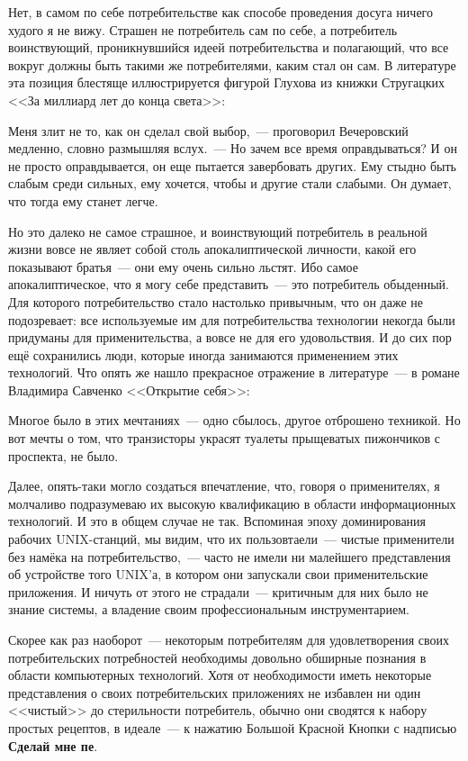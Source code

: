 Нет, в самом по себе потребительстве как способе проведения досуга ничего худого я не вижу. Страшен не потребитель сам по себе, а потребитель воинствующий, проникнувшийся идеей потребительства и полагающий, что все вокруг должны быть такими же потребителями, каким стал он сам. В литературе эта позиция блестяще иллюстрируется фигурой Глухова из книжки Стругацких <<За миллиард лет до конца света>>:

\begin{shadequote}{}
Меня злит не то, как он сделал свой выбор,~--- проговорил Вечеровский медленно, словно размышляя вслух.~--- Но зачем все время оправдываться? И он не просто оправдывается, он еще пытается завербовать других. Ему стыдно быть слабым среди сильных, ему хочется, чтобы и другие стали слабыми. Он думает, что тогда ему станет легче.
\end{shadequote}

Но это далеко не самое страшное, и воинствующий потребитель в реальной жизни вовсе не являет собой столь апокалиптической личности, какой его показывают братья~--- они ему очень сильно льстят. Ибо самое апокалиптическое, что я могу себе представить~--- это потребитель обыденный. Для которого потребительство стало настолько привычным, что он даже не подозревает: все используемые им для потребительства технологии некогда были придуманы для применительства, а вовсе не для его удовольствия. И до сих пор ещё сохранились люди, которые иногда занимаются применением этих технологий. Что опять же нашло прекрасное отражение в литературе~--- в романе Владимира Савченко <<Открытие себя>>:
\begin{shadequote}{}
Многое было в этих мечтаниях~--- одно сбылось, другое отброшено техникой. Но вот мечты о том, что транзисторы украсят туалеты прыщеватых пижончиков с проспекта, не было.
\end{shadequote}

Далее, опять-таки могло создаться впечатление, что, говоря о применителях, я молчаливо подразумеваю их высокую квалификацию в области информационных технологий. И это в общем случае не так. Вспоминая эпоху доминирования рабочих UNIX-станций, мы видим, что их пользовтаели~--- чистые применители без намёка на потребительство,~--- часто не имели ни малейшего представления об устройстве того UNIX'а, в котором они запускали свои применительские приложения. И ничуть от этого не страдали~--- критичным для них было не знание системы, а владение своим профессиональным инструментарием.

Скорее как раз наоборот~--- некоторым потребителям для удовлетворения своих потребительских потребностей необходимы довольно обширные познания в области компьютерных технологий. Хотя от необходимости иметь некоторые представления о своих потребительских приложениях не избавлен ни один <<чистый>> до стерильности потребитель, обычно они сводятся к набору простых рецептов, в идеале~--- к нажатию Большой Красной Кнопки с надписью \textbf{Сделай мне пе}.

